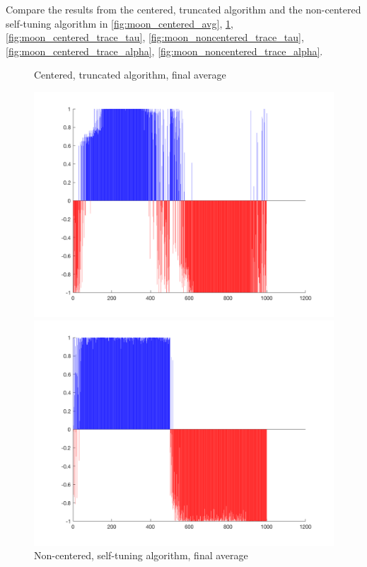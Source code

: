 \documentclass{siamart1116}
\begin{document}
Compare the results from the centered, truncated algorithm and the non-centered self-tuning algorithm in \cref{fig:moon_centered_avg}, \cref{fig:moon_noncentered_avg}, \cref{fig:moon_centered_trace_tau}, \cref{fig:moon_noncentered_trace_tau}, \cref{fig:moon_centered_trace_alpha}, \cref{fig:moon_noncentered_trace_alpha}.
\begin{figure}[H]
    \begin{minipage}{0.48\textwidth}
        \centering
        \caption{\label{fig:moon_centered_avg} Centered, truncated algorithm, final average}
        \includegraphics[width=\linewidth]{graphics/moons/centered_truncated/final_avg.png}
    \end{minipage} \hfill
    \begin{minipage}{0.48\textwidth}
        \centering
        \caption{\label{fig:moon_noncentered_avg} Non-centered, self-tuning algorithm, final average}
        \includegraphics[width=\linewidth]{graphics/moons/noncentered_selftuning/final_avg.png}
    \end{minipage}
\end{figure}
\end{document}
